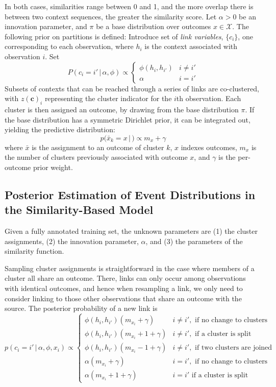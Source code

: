 \documentclass[12pt,letterpaper]{report}
\newcommand{\given}{\, \vert \,}
\newcommand{\bc}{\mathbf{c}}
\begin{document}
In both cases, similarities range between 0 and 1, and the
more overlap there is between two context sequences, the greater the
similarity score.  Let $\alpha > 0$ be an innovation parameter, and
$\pi$ be a base distribution over outcomes $x \in \mathcal{X}$.  The
following prior on partitions is defined: Introduce
set of {\it link variables}, $\{c_i\}$, one corresponding to each
observation, where $h_i$ is the context associated with observation $i$.  Set
\begin{equation}
  P(c_i = i' \given \alpha, \phi) \propto
  \begin{cases}
    \phi(h_i, h_{i'}) & i \neq i' \\
    \alpha & i = i'
  \end{cases}
\end{equation}
Subsets of contexts that can be reached through a series of links
are co-clustered, with $z(\bc)_i$ representing the cluster indicator
for the $i$th observation.  Each cluster is then assigned an outcome,
by drawing from the base distribution $\pi$.  If the base distribution
has a symmetric Dirichlet prior, it can be integrated out, yielding the
predictive distribution:
\begin{equation}
  p(\bar{x}_k = x \given \bm) \propto m_x + \gamma
\end{equation}
where $\bar{x}$ is the assignment to an outcome of cluster $k$, $x$
indexes outcomes, $m_x$ is the number of clusters previously
associated with outcome $x$, and $\gamma$ is the per-outcome prior weight.

\subsection{Posterior Estimation of Event Distributions in the Similarity-Based
  Model}

Given a fully annotated training set, the unknown parameters are (1)
the cluster assignments, (2) the innovation parameter, $\alpha$, and
(3) the parameters of the similarity function.  

Sampling cluster assignments is straightforward in the case where
members of a cluster all share an outcome.  There, links can only
occur among observations with identical outcomes, and hence when
resampling a link, we only need to consider linking to those other
observations that share an outcome with the source.  The posterior
probability of a new link is
\begin{equation}
  p(c_i = i' \given \alpha, \phi, x_i) \propto 
  \begin{cases}
    \phi(h_i,h_{i'}) (m_{x_i} + \gamma) & i \neq i', \text{ if no change to clusters} \\
    \phi(h_i,h_{i'}) (m_{x_i} + 1 + \gamma) & i \neq i', \text{ if a
      cluster is split } \\
    \phi(h_i,h_{i'}) (m_{x_i} - 1 + \gamma) & i \neq i', \text{ if two
    clusters are joined} \\
  \alpha (m_{x_i} + \gamma) & i = i', \text{ if no change to clusters}
  \\
  \alpha (m_{x_i} + 1 + \gamma) & i = i' \text{ if a cluster is split}
  \end{cases}
\end{equation}
\end{document}
